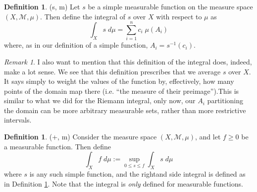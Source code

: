 \documentclass[12pt]{article}
\theoremstyle{plain}
\theoremstyle{definition}
\newtheorem{defn}[thm]{Definition}
\theoremstyle{remark}
\newtheorem*{rmk}{Remark}
\begin{document}
\begin{defn} 
\label{simpleint}    
(s, m)
Let $s$ be a simple measurable function on the measure space $(X,\mathscr{M},\mu)$. Then define the integral of $s$ over $X$ with respect to $\mu$ as 
\begin{equation}
    \int_X s \; d\mu = \sum^n_{i=1} c_i \; \mu(A_i)
\end{equation}
where, as in our definition of a simple function,  $A_i = s^{-1}(c_i)$.
\end{defn}

\begin{rmk}
I also want to mention that this definition of the integral does, indeed, make a lot sense. We see that this definition prescribes that we average $s$ over $X$.  It says simply to weight the values of the function by, effectively, how many points of the domain map there (i.e. ``the measure of their preimage'').This is similar to what we did for the Riemann integral, only now, our $A_i$ partitioning the domain can be more arbitrary measurable sets, rather than more restrictive intervals.
\end{rmk}

\begin{defn} (+, m)
Consider the measure space $(X,\mathscr{M},\mu)$, and let $f\geq0$ be a measurable function. Then define
\[
    \int_X f \; d\mu := \sup_{0\leq s\leq f} \int_X s \; d\mu
\]
where $s$ is any such simple function, and the rightand side integral is defined as in Definition \ref{simpleint}. Note that the integral is \emph{only} defined for measurable functions.
\end{defn}
\end{document}
